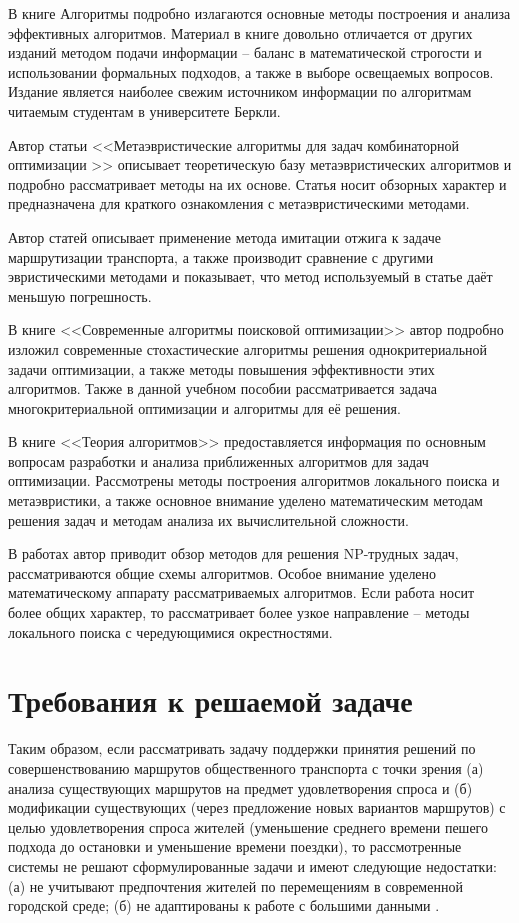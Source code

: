 В книге Алгоритмы\cite{bib:47} подробно излагаются основные методы построения и анализа эффективных 
алгоритмов. Материал в книге довольно отличается от других изданий методом подачи информации -- баланс в 
математической строгости и использовании формальных подходов, а также в выборе освещаемых вопросов. 
Издание является наиболее свежим источником информации по алгоритмам читаемым студентам в университете Беркли.

Автор статьи <<Метаэвристические алгоритмы для задач комбинаторной оптимизации >>\cite{bib:48} описывает 
теоретическую базу метаэвристических алгоритмов и подробно рассматривает методы на их основе. Статья носит 
обзорных характер и предназначена для краткого ознакомления с метаэвристическими методами.

Автор статей \cite{bib:50,bib:51} описывает применение метода имитации отжига к задаче маршрутизации 
транспорта, а также производит сравнение с другими эвристическими методами и показывает, что метод 
используемый в статье даёт меньшую погрешность.

В книге <<Современные алгоритмы поисковой оптимизации>>\cite{bib:52} автор подробно изложил современные 
стохастические алгоритмы решения однокритериальной задачи оптимизации, а также методы повышения 
эффективности этих алгоритмов. Также в данной учебном пособии рассматривается задача многокритериальной 
оптимизации и алгоритмы для её решения.

В книге <<Теория алгоритмов>>\cite{bib:53} предоставляется информация по основным вопросам разработки и 
анализа приближенных алгоритмов для задач оптимизации. Рассмотрены методы построения алгоритмов 
локального поиска и метаэвристики, а также основное внимание уделено математическим методам решения задач 
и методам анализа их вычислительной сложности.

В работах \cite{bib:54,bib:57} автор приводит обзор методов для решения NP-трудных задач, рассматриваются 
общие схемы алгоритмов. Особое внимание уделено математическому аппарату рассматриваемых алгоритмов. 
Если работа \cite{bib:54} носит более общих характер, то \cite{bib:57} рассматривает более узкое 
направление -- методы локального поиска с чередующимися окрестностями.

\section{Требования к решаемой задаче}
Таким образом, если рассматривать задачу поддержки принятия решений по совершенствованию маршрутов 
общественного транспорта с точки зрения (а) анализа существующих маршрутов на предмет удовлетворения 
спроса и (б) модификации существующих (через предложение новых вариантов маршрутов) с целью удовлетворения 
спроса жителей (уменьшение среднего времени пешего подхода до остановки и уменьшение времени поездки), то 
рассмотренные системы не решают сформулированные задачи и имеют следующие недостатки: (а) не учитывают 
предпочтения жителей по перемещениям в современной городской среде; (б) не адаптированы к работе с 
большими данными \cite{bib:20,bib:20.2}.

